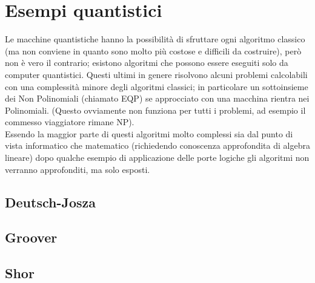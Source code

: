 \section{Esempi quantistici}
Le macchine quantistiche hanno la possibilità di sfruttare ogni algoritmo classico (ma non conviene in quanto sono molto più costose e difficili da costruire), però non è vero il contrario; esistono algoritmi che possono essere eseguiti solo da computer quantistici.
Questi ultimi in genere risolvono alcuni problemi calcolabili con una complessità minore degli algoritmi classici; in particolare un sottoinsieme dei Non Polinomiali (chiamato EQP) se approcciato con una macchina rientra nei Polinomiali. (Questo ovviamente non funziona per tutti i problemi, ad esempio il commesso viaggiatore rimane NP).\\
Essendo la maggior parte di questi algoritmi molto complessi sia dal punto di vista informatico che matematico (richiedendo conoscenza approfondita di algebra lineare) dopo qualche esempio di applicazione delle porte logiche gli algoritmi non verranno approfonditi, ma solo esposti.
\subsection{Deutsch-Josza}
\subsection{Groover}
\subsection{Shor}
